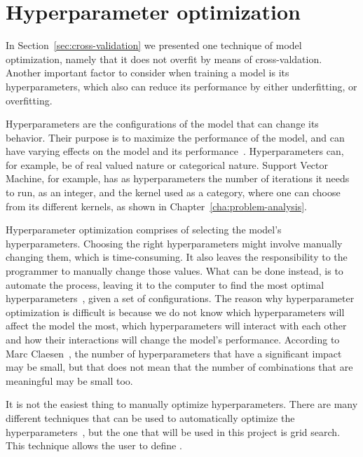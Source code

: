 \section{Hyperparameter optimization}\label{sec:hyperparam}

In Section~\ref{sec:cross-validation} we presented one technique of model optimization, namely that it does not overfit by means of cross-valdation. Another important factor to consider when training a model is its hyperparameters, which also can reduce its performance by either underfitting, or overfitting.


Hyperparameters are the configurations of the model that can change its behavior. Their purpose is to maximize the performance of the model, and can have varying effects on the model and its performance~\cite{hyperparam-search}. Hyperparameters can, for example, be of real valued nature or categorical nature. Support Vector Machine, for example, has as hyperparameters the number of iterations it needs to run, as an integer, and the kernel used as a category, where one can choose from its different kernels, as shown in Chapter~\ref{cha:problem-analysis}.


Hyperparameter optimization comprises of selecting the model's hyperparameters. Choosing the right hyperparameters might involve manually changing them, which is time-consuming. It also leaves the responsibility to the programmer to manually change those values. What can be done instead, is to automate the process, leaving it to the computer to find the most optimal hyperparameters~\cite{automated-machine-learning}, given a set of configurations. The reason why hyperparameter optimization is difficult is because we do not know which hyperparameters will affect the model the most, which hyperparameters will interact with each other and how their interactions will change the model's performance. According to Marc Claesen~\cite{hyperparam-search}, the number of hyperparameters that have a significant impact may be small, but that does not mean that the number of combinations that are meaningful may be small too. 

It is not the easiest thing to manually optimize hyperparameters. There are many different techniques that can be used to automatically optimize the hyperparameters~\cite{automated-machine-learning}, but the one that will be used in this project is grid search. This technique allows the user to define .



